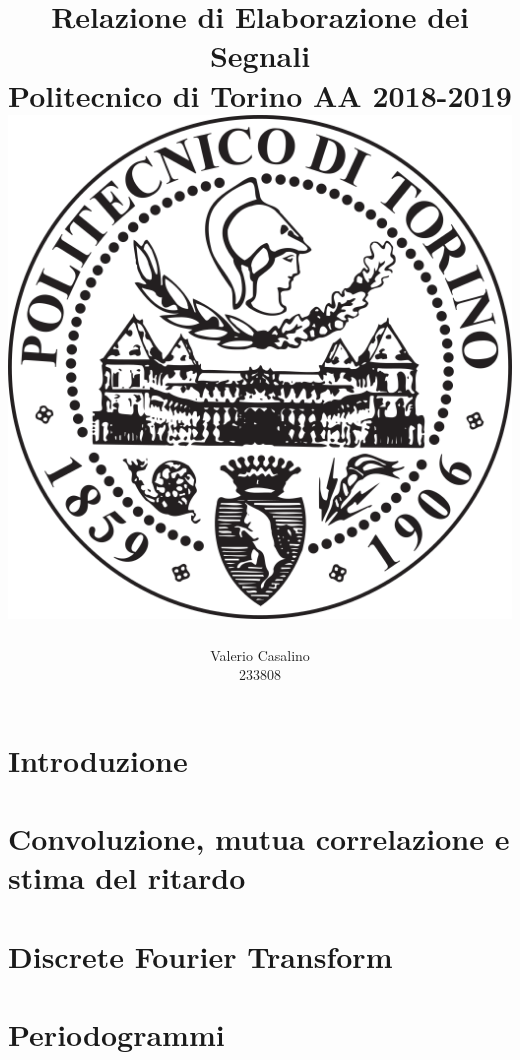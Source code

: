 \documentclass[12pt, openany, a4paper]{report}
\author{
\LARGE
Valerio Casalino \\ 
\LARGE
233808 
}
\title{ 
\Huge
\textbf{Relazione di Elaborazione dei Segnali} \\ 
\LARGE
Politecnico di Torino AA 2018-2019 \\
\vspace*{2cm} \includegraphics[width=.5\textwidth]{images/logo.png}
}
\date{}
\begin{document}
\maketitle

\cleardoublepage
\tableofcontents

\chapter{Introduzione}


\chapter{Convoluzione, mutua correlazione e stima del ritardo}


\chapter{Discrete Fourier Transform}


\chapter{Periodogrammi}

\end{document}
